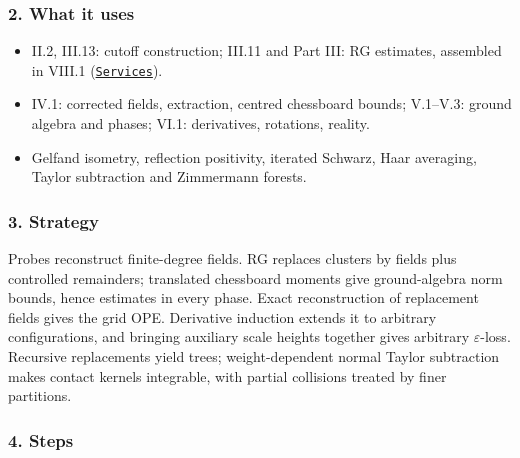 \documentclass[
  letterpaper,
  11pt]{article}
\providecommand{\tightlist}{%
  \setlength{\itemsep}{0pt}\setlength{\parskip}{0pt}}
\begin{document}
\subsubsection{2. What it uses}\label{what-it-uses-28}

\begin{itemize}
\tightlist
\item
  II.2, III.13: cutoff construction; III.11 and Part III: RG estimates,
  assembled in VIII.1
  (\href{https://github.com/yang-mills-group/OpenAI-YM-20261028/blob/3456e5e75cf8d4cd558955a5c7638fba2d68f464/YM/OPE/Exchange/Arrangement.lean\#L56-L60}{\texttt{Services}}).
\item
  IV.1: corrected fields, extraction, centred chessboard bounds;
  V.1--V.3: ground algebra and phases; VI.1: derivatives, rotations,
  reality.
\item
  Gelfand isometry, reflection positivity, iterated Schwarz, Haar
  averaging, Taylor subtraction and Zimmermann forests.
\end{itemize}

\subsubsection{3. Strategy}\label{strategy-28}

Probes reconstruct finite-degree fields. RG replaces clusters by fields
plus controlled remainders; translated chessboard moments give
ground-algebra norm bounds, hence estimates in every phase. Exact
reconstruction of replacement fields gives the grid OPE. Derivative
induction extends it to arbitrary configurations, and bringing auxiliary
scale heights together gives arbitrary \(\varepsilon\)-loss. Recursive
replacements yield trees; weight-dependent normal Taylor subtraction
makes contact kernels integrable, with partial collisions treated by
finer partitions.

\subsubsection{4. Steps}\label{steps-28}
\end{document}
